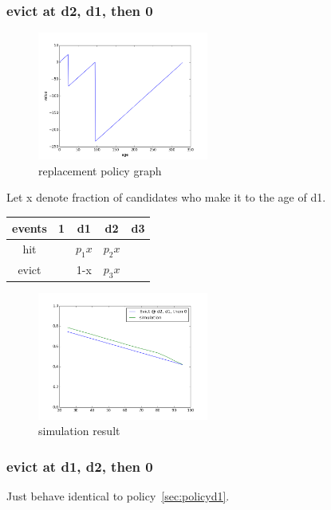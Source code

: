 \documentclass[12pt, letterpaper]{article}
\begin{document}
\subsubsection{evict at d2, d1, then 0}

\begin{figure}[H]
\centering
\includegraphics[width=0.5\textwidth]{evict_d2_d1.png}
\caption{replacement policy graph}
\end{figure}

Let x denote fraction of candidates who make it to the age of d1.

\begin{center}
\begin{tabular}{c | c c c c}
\hline
events & 1 & d1 & d2 & d3 \\
\hline
hit & & $p_1 x$ & $p_2 x$ &  \\
evict & & 1-x & $p_3 x$ & 
\end{tabular}
\end{center}

\begin{figure}[H]
\centering
\includegraphics[width=0.5\textwidth]{sim_d2_d1.png}
\caption{simulation result}
\end{figure}

\subsubsection{evict at d1, d2, then 0}

Just behave identical to policy~\ref{sec:policyd1}.
\end{document}
